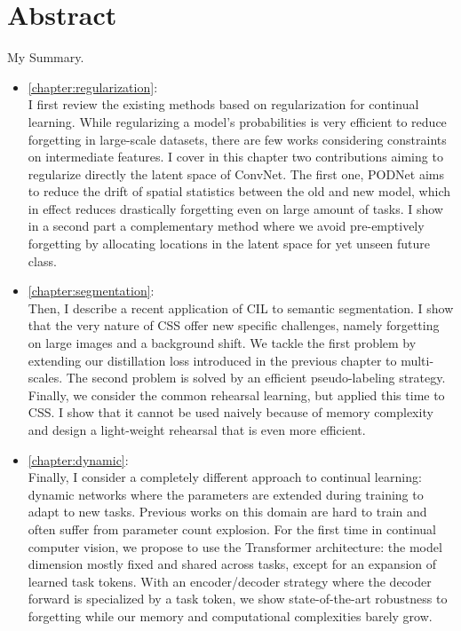 \cleardoublepage
\setcounter{page}{1}

\chapter{Abstract}

My Summary.

\begin{itemize}
      \item \autoref{chapter:regularization}: \\
            I first review the existing methods based on regularization for continual learning. While
            regularizing a model's probabilities is very efficient to reduce forgetting in large-scale
            datasets, there are few works considering constraints on intermediate features. I cover in this
            chapter two contributions aiming to regularize directly the latent space of \acs{ConvNet}. The
            first one, \acf{PODNet} aims to reduce the drift of spatial statistics between the old and new
            model, which in effect reduces drastically forgetting even on large amount of tasks. I show in a
            second part a complementary method where we avoid pre-emptively forgetting by allocating
            locations in the latent space for yet unseen future class.
      \item \autoref{chapter:segmentation}: \\
            Then, I describe a recent application of \acf{CIL} to semantic segmentation. I show that
            the very nature of \acf{CSS} offer new specific challenges, namely forgetting on large
            images and a background shift. We tackle the first problem by extending our distillation
            loss introduced in the previous chapter to multi-scales. The second problem is solved by
            an efficient pseudo-labeling strategy. Finally, we consider the common rehearsal learning,
            but applied this time to \ac{CSS}. I show that it cannot be used naively because of memory
            complexity and design a light-weight rehearsal that is even more efficient.
      \item \autoref{chapter:dynamic}: \\
            Finally, I consider a completely different approach to continual learning: dynamic networks
            where the parameters are extended during training to adapt to new tasks. Previous works on
            this domain are hard to train and often suffer from parameter count explosion. For the
            first time in continual computer vision, we propose to use the Transformer architecture:
            the model dimension mostly fixed and shared across tasks, except for an
            expansion of learned task tokens. With an encoder/decoder strategy where the decoder
            forward is specialized by a task token, we show state-of-the-art robustness to forgetting
            while our memory and computational complexities barely grow.
\end{itemize}

